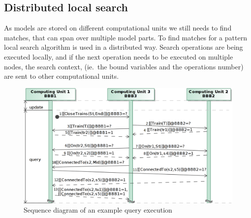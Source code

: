 \subsection{Distributed local search}

As models are stored on different computational units we still needs to find matches, that can span over multiple model parts. To find matches for a pattern local search algorithm is used in a distributed way. Search operations are being executed locally, and if the next operation needs to be executed on multiple nodes, the search context, (ie.\ the bound variables and the operations number) are sent to other computational units.

\begin{figure}[h]
	\begin{center}
		\includegraphics[width=1\textwidth]{figures/seq-diagram-query-exec.png}
		\caption{Sequence diagram of an example query execution}
		\label{fig:distibuted-exec}
		
	\end{center}
\end{figure}



